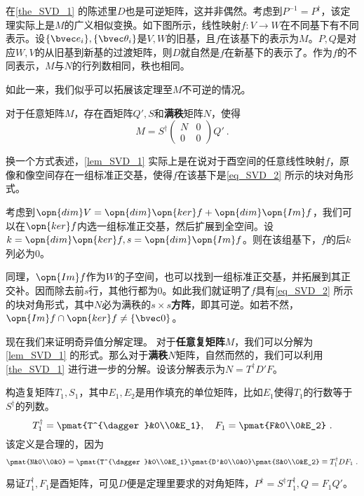 在\autoref{the_SVD_1} 的陈述里$D$也是可逆矩阵，这并非偶然。考虑到$P^{-1}=P^{\dagger}$，该定理实际上是$M$的广义相似变换。如下图所示，线性映射$f:V\rightarrow W$在不同基下有不同表示。设$\{\bvec e_i\},\{\bvec \theta_i\}$是$V,W$的旧基，且$f$在该基下的表示为$M$。$P,Q$是对应$W,V$的从旧基到新基的过渡矩阵，则$D$就自然是$f$在新基下的表示了。作为$f$的不同表示，$M$与$N$的行列数相同，秩也相同。

如此一来，我们似乎可以拓展该定理至$M$不可逆的情况。

\begin{lemma}{}\label{lem_SVD_1}
对于任意矩阵$M$，存在酉矩阵$Q',S$和\textbf{满秩}矩阵$N$，使得
\begin{equation}\label{eq_SVD_2}
M=S^{\dagger}\left(\begin{array}{cc}
N & 0 \\
0 & 0
\end{array}\right) Q'~.
\end{equation}
\end{lemma}


换一个方式表述，\autoref{lem_SVD_1} 实际上是在说对于酉空间的任意线性映射$f$，原像和像空间存在一组标准正交基，使得$f$在该基下是\autoref{eq_SVD_2} 所示的块对角形式。

考虑到$\opn{dim}V=\opn{dim}\opn{ker}f+\opn{dim}\opn{Im}f$，我们可以在$\opn{ker}f$内选一组标准正交基，然后扩展到全空间。设$k=\opn{dim}\opn{ker}f,s=\opn{dim}\opn{Im}f$。则在该组基下，$f$的后$k$列必为$0$。

同理，$\opn{Im}f$作为$W$的子空间，也可以找到一组标准正交基，并拓展到其正交补。因而除去前$s$行，其他行都为$0$。如此我们就证明了$f$具有\autoref{eq_SVD_2} 所示的块对角形式，其中$N$必为满秩的$s\times s$\textbf{方阵}，即其可逆。如若不然，$\opn{Im}f\cap\opn{ker}f\neq\{\bvec 0\}$。

现在我们来证明奇异值分解定理。
对于\textbf{任意复矩阵}$M$，我们可以分解为\autoref{lem_SVD_1} 的形式。那么对于\textbf{满秩}$N$矩阵，自然而然的，我们可以利用\autoref{the_SVD_1} 进行进一步的分解。设该分解表示为$N=T^{\dagger}D'F$。

构造复矩阵$T_1,S_1$，其中$E_1,E_2$是用作填充的单位矩阵，比如$E_1$使得$T_1$的行数等于$S^{\dagger}$的列数。
\begin{equation}
T_1^{\dagger}=\pmat{T^{\dagger}&0\\0&E_1},\quad F_1=\pmat{F&0\\0&E_2}
~.
\end{equation}
该定义是合理的，因为
\begin{equation}
\pmat{N&0\\0&0}=\pmat{T^{\dagger}&0\\0&E_1}\pmat{D'&0\\0&0}\pmat{S&0\\0&E_2}\equiv T_1^{\dagger}DF_1~.
\end{equation}

易证$T_1^{\dagger},F_1$是酉矩阵，可见$D$便是定理里要求的对角矩阵，$P^{\dagger}=S^{\dagger}T_1^{\dagger},Q=F_1Q'$。












